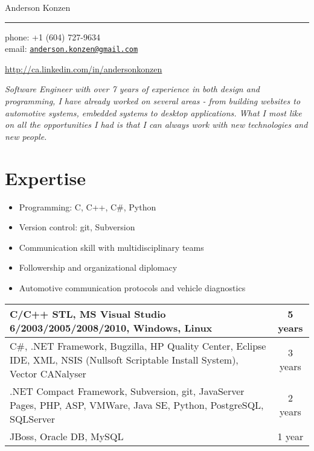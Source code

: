 \documentclass[10pt,a4paper]{article}
\makeatletter
\def\myname{Anderson Konzen}
\def\myemail{anderson.konzen@gmail.com}
\def\myskype{andersonkonzen}
\def\mycellphone{+1 (604) 727-9634}
\def\mylinkedin{http://ca.linkedin.com/in/andersonkonzen}
\def\myaddress{142 E. 42nd Avenue\\Vancouver \textsc{bc} \ V5W 1S6}
\makeatother
\begin{document}
{\LARGE \myname}\\
\hrule
\vspace{0.2in}
{\large phone: \mycellphone}\\[.05cm]
{\large email: \href{mailto:\myemail}{\texttt{\myemail}}}\\[.05cm]
{\large \href{\mylinkedin}{\mylinkedin}\\[.2cm]
\vspace{2.0in}

\textit{Software Engineer with over 7 years of experience in both design and programming, I have already worked on several areas - from building websites to automotive systems, embedded systems to desktop applications. What I most like on all the opportunities I had is that I can always work with new technologies and new people.}

\section*{Expertise}
\begin{itemize}
  \item Programming: C, C++, C\#, Python
  \item Version control: git, Subversion
  \item Communication skill with multidisciplinary teams
  \item Followership and organizational diplomacy
  \item Automotive communication protocols and vehicle diagnostics
\end{itemize}
\vspace{0.1in}
\begin{center}
  \begin{tabular}{p{9cm}c}
  \toprule
  C/C++ STL, MS Visual Studio 6/2003/2005/2008/2010, Windows, Linux & 5 years \\
  \midrule
  C\#, .NET Framework, Bugzilla, HP Quality Center, Eclipse IDE, XML, NSIS (Nullsoft Scriptable Install System), Vector CANalyser & 3 years \\
  \midrule
  .NET Compact Framework, Subversion, git, JavaServer Pages, PHP, ASP, VMWare, Java SE, Python, PostgreSQL, SQLServer & 2 years \\
  \midrule
  JBoss, Oracle DB, MySQL & 1 year \\
  \bottomrule
  \end{tabular}
\end{center}

}
\end{document}
